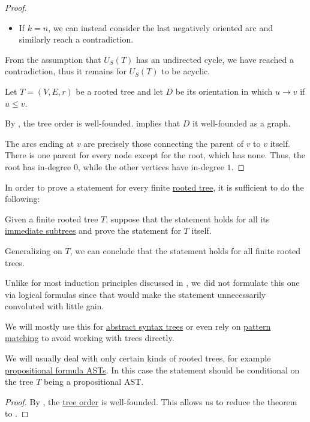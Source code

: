 \begin{proof}
\begin{itemize}
    \item If \( k = n \), we can instead consider the last negatively oriented arc and similarly reach a contradiction.
  \end{itemize}

  From the assumption that \( U_S(T) \) has an undirected cycle, we have reached a contradiction, thus it remains for \( U_S(T) \) to be acyclic.

   Let \( T = (V, E, r) \) be a rooted tree and let \( D \) be its orientation in which \( u \to v \) if \( u \leq v \).

   By , the tree order is well-founded.  implies that \( D \) it well-founded as a graph.

   The arcs ending at \( v \) are precisely those connecting the parent of \( v \) to \( v \) itself. There is one parent for every node except for the root, which has none. Thus, the root has in-degree \( 0 \), while the other vertices have in-degree \( 1 \).
\end{proof}

\begin{theorem}\label{thm:induction_on_rooted_trees}\mimprovised
  In order to prove a statement for every finite \hyperref[def:rooted_tree]{rooted tree}, it is sufficient to do the following:
  \begin{displayquote}
    Given a finite rooted tree \( T \), suppose that the statement holds for all its \hyperref[def:rooted_tree/immediate_subtree]{immediate subtrees} and prove the statement for \( T \) itself.
  \end{displayquote}

  Generalizing on \( T \), we can conclude that the statement holds for all finite rooted trees.
\end{theorem}
\begin{comments}
  \item Unlike for most induction principles discussed in , we did not formulate this one via logical formulas since that would make the statement unnecessarily convoluted with little gain.

  \item We will mostly use this for \hyperref[con:abstract_syntax_tree]{abstract syntax trees} or even rely on \hyperref[con:evaluation]{pattern matching} to avoid working with trees directly.

  \item We will usually deal with only certain kinds of rooted trees, for example \hyperref[def:propositional_formula_ast]{propositional formula ASTs}. In this case the statement should be conditional on the tree \( T \) being a propositional AST.
\end{comments}
\begin{proof}
  By , the \hyperref[def:rooted_tree]{tree order} is well-founded. This allows us to reduce the theorem to .
\end{proof}

